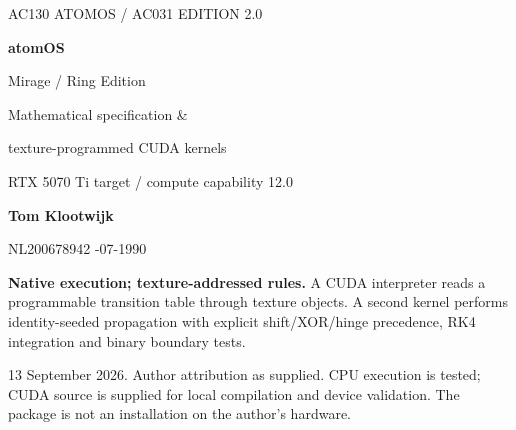 \documentclass[11pt,a4paper]{article}
\newcommand{\ph}{\varphi}
\begin{document}
\begin{titlepage}\thispagestyle{empty}
{\sffamily\large\color{forest}AC130 ATOMOS / AC031 \hfill EDITION 2.0}\par
\vspace{18mm}
{\sffamily\bfseries\fontsize{64}{68}\selectfont\color{forest}atomOS}\par
\vspace{4mm}
{\sffamily\fontsize{27}{33}\selectfont\color{ink}Mirage / Ring Edition}\par
\vspace{7mm}
{\Large Mathematical specification \&\par texture-programmed CUDA kernels}\par
\vspace{7mm}
{\large RTX 5070 Ti target \; / \; compute capability 12.0}\par
\vspace{8mm}
\begin{center}
\end{center}
\vfill
{\sffamily\bfseries\Large Tom Klootwijk}\par
{\large NL200678942 \quad\textbullet{}-07-1990}\par
\vspace{5mm}
\begin{contract}
\textbf{Native execution; texture-addressed rules.} A CUDA interpreter reads a programmable transition table through texture objects. A second kernel performs identity-seeded propagation with explicit shift/XOR/hinge precedence, RK4 integration and binary boundary tests.
\end{contract}
{\small\color{muted}13 September 2026. Author attribution as supplied. CPU execution is tested; CUDA source is supplied for local compilation and device validation. The package is not an installation on the author's hardware.}
\end{titlepage}
\end{document}
